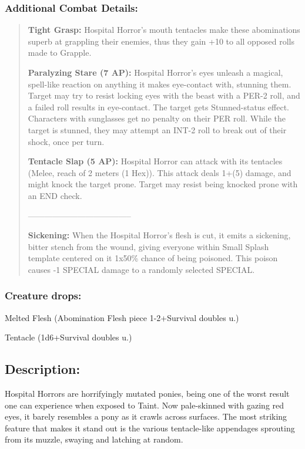 \documentclass[11pt,a4paper,twocolumn]{book}
\begin{document}
	\subsubsection*{Additional Combat Details:}
	\begin{verse}
		\textbf{Tight Grasp:} Hospital Horror's mouth tentacles make these abominations superb at grappling their enemies, thus they gain +10 to all opposed rolls made to Grapple.
		
		\textbf{Paralyzing Stare (7 AP):} Hospital Horror's eyes unleash a magical, spell-like reaction on anything it makes eye-contact with, stunning them. Target may try to resist locking eyes with the beast with a PER-2 roll, and a failed roll results in eye-contact. The target gets Stunned-status effect. Characters with sunglasses get no penalty on their PER roll.
		While the target is stunned, they may attempt an INT-2 roll to break out of their shock, once per turn.
		
		\textbf{Tentacle Slap (5 AP):} Hospital Horror can attack with its tentacles (Melee, reach of 2 meters (1 Hex)). This attack deals 1+(5) damage, and might knock the target prone. Target may resist being knocked prone with an END check.
		
		--------------------------------------
		
		\textbf{Sickening:} When the Hospital Horror's flesh is cut, it emits a sickening, bitter stench from the wound, giving everyone within Small Splash template centered on it 1x50\% chance of being poisoned. This poison causes -1 SPECIAL damage to a randomly selected SPECIAL.

	\end{verse}
	
	\subsubsection*{Creature drops:}
	\begin{compactitem}
		\item Melted Flesh (Abomination Flesh piece 1-2+Survival doubles u.)
		\item Tentacle (1d6+Survival doubles u.)
	\end{compactitem}
	
	\subsection*{Description:}
	Hospital Horrors are horrifyingly mutated ponies, being one of the worst result one can experience when exposed to Taint. Now pale-skinned with gazing red eyes, it barely resembles a pony as it crawls across surfaces. The most striking feature that makes it stand out is the various tentacle-like appendages sprouting from its muzzle, swaying and latching at random.
	
\end{document}
